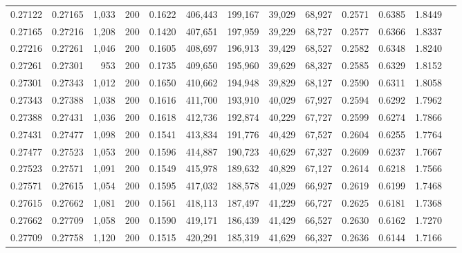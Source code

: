 \begin{tabular}{rrrrrrrrrrrrr}
0.27122 & 0.27165 & 1,033 & 200 &                                     0.1622 & 406,443 & 199,167 &  39,029 &  68,927 & 0.2571 & 0.6385 & 1.8449 \\
0.27165 & 0.27216 & 1,208 & 200 &                                     0.1420 & 407,651 & 197,959 &  39,229 &  68,727 & 0.2577 & 0.6366 & 1.8337 \\
0.27216 & 0.27261 & 1,046 & 200 &                                     0.1605 & 408,697 & 196,913 &  39,429 &  68,527 & 0.2582 & 0.6348 & 1.8240 \\
0.27261 & 0.27301 &   953 & 200 &                                     0.1735 & 409,650 & 195,960 &  39,629 &  68,327 & 0.2585 & 0.6329 & 1.8152 \\
0.27301 & 0.27343 & 1,012 & 200 &                                     0.1650 & 410,662 & 194,948 &  39,829 &  68,127 & 0.2590 & 0.6311 & 1.8058 \\
0.27343 & 0.27388 & 1,038 & 200 &                                     0.1616 & 411,700 & 193,910 &  40,029 &  67,927 & 0.2594 & 0.6292 & 1.7962 \\
0.27388 & 0.27431 & 1,036 & 200 &                                     0.1618 & 412,736 & 192,874 &  40,229 &  67,727 & 0.2599 & 0.6274 & 1.7866 \\
0.27431 & 0.27477 & 1,098 & 200 &                                     0.1541 & 413,834 & 191,776 &  40,429 &  67,527 & 0.2604 & 0.6255 & 1.7764 \\
0.27477 & 0.27523 & 1,053 & 200 &                                     0.1596 & 414,887 & 190,723 &  40,629 &  67,327 & 0.2609 & 0.6237 & 1.7667 \\
0.27523 & 0.27571 & 1,091 & 200 &                                     0.1549 & 415,978 & 189,632 &  40,829 &  67,127 & 0.2614 & 0.6218 & 1.7566 \\
0.27571 & 0.27615 & 1,054 & 200 &                                     0.1595 & 417,032 & 188,578 &  41,029 &  66,927 & 0.2619 & 0.6199 & 1.7468 \\
0.27615 & 0.27662 & 1,081 & 200 &                                     0.1561 & 418,113 & 187,497 &  41,229 &  66,727 & 0.2625 & 0.6181 & 1.7368 \\
0.27662 & 0.27709 & 1,058 & 200 &                                     0.1590 & 419,171 & 186,439 &  41,429 &  66,527 & 0.2630 & 0.6162 & 1.7270 \\
0.27709 & 0.27758 & 1,120 & 200 &                                     0.1515 & 420,291 & 185,319 &  41,629 &  66,327 & 0.2636 & 0.6144 & 1.7166 \\

\end{tabular}
